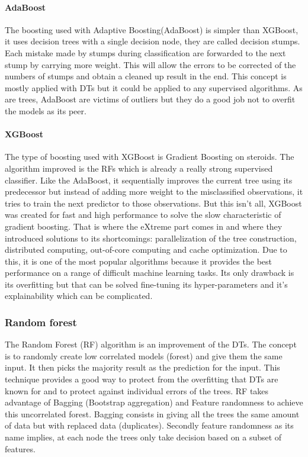 \paragraph{AdaBoost}
The boosting used with Adaptive Boosting(AdaBoost) is simpler than XGBoost, it uses decision trees with a single decision node, they are called decision stumps. Each mistake made by stumps during classification are forwarded to the next stump by carrying more weight. This will allow the errors to be corrected of the numbers of stumps and obtain a cleaned up result in the end. This concept is mostly applied with DTs but it could be applied to any supervised algorithms. As are trees, AdaBoost are victims of outliers but they do a good job not to overfit the models as its peer. 

\paragraph{XGBoost}
The type of boosting used with XGBoost is Gradient Boosting on steroids. The algorithm improved is the RFs which is already a really strong supervised classifier. Like the AdaBoost, it sequentially improves the current tree using its predecessor but instead of adding more weight to the misclassified observations, it tries to train the next predictor to those observations. But this isn't all, XGBoost was created for fast and high performance to solve the slow characteristic of gradient boosting. That is where the eXtreme part comes in and where they introduced solutions to its shortcomings: parallelization of the tree construction,  distributed computing, out-of-core computing and cache optimization.\cite{xgboost} Due to this, it is one of the most popular algorithms because it provides the best performance on a range of difficult machine learning tasks. Its only drawback is its overfitting but that can be solved fine-tuning its hyper-parameters and it's explainability which can be complicated.

\subsubsection{Random forest}
The Random Forest (RF) algorithm is an improvement of the DTs. The concept is to randomly create low correlated models (forest) and give them the same input. It then picks the majority result as the prediction for the input. This technique provides a good way to protect from the overfitting that DTs are known for and to protect against individual errors of the trees. RF takes advantage of Bagging (Bootstrap aggregation) and Feature randomness to achieve this uncorrelated forest.
Bagging consists in giving all the trees the same amount of data but with replaced data (duplicates). Secondly feature randomness as its name implies, at each node the trees only take decision based on a subset of features.\cite{rf}

